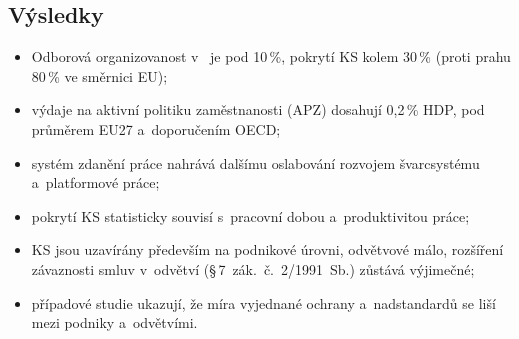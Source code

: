 \documentclass[czech]{CTUposter}
\begin{document}
\begin{posterbody}
\section{Výsledky}
\begin{itemize}
  \item Odborová organizovanost v~ je pod 10\,\%, pokrytí \acs{KS} kolem 30\,\% (proti prahu 80\,\% ve směrnici \acs{EU});
  \item výdaje na aktivní politiku zaměstnanosti (APZ) dosahují 0,2\,\% \acs{HDP}, pod průměrem EU27 a~doporučením OECD;
  \item systém zdanění práce nahrává dalšímu oslabování rozvojem švarcsystému a~platformové práce;
  \item pokrytí \acs{KS} statisticky souvisí s~pracovní dobou a~produktivitou práce;
  \item \acs{KS} jsou uzavírány především na podnikové úrovni, odvětvové málo, rozšíření závaznosti smluv v~odvětví (\S\,7~zák.~č.~2/1991~Sb.) zůstává výjimečné;
  \item případové studie ukazují, že míra vyjednané ochrany a~nadstandardů se liší mezi podniky a~odvětvími.
\end{itemize}

\columnbreak


\end{posterbody}
\end{document}
